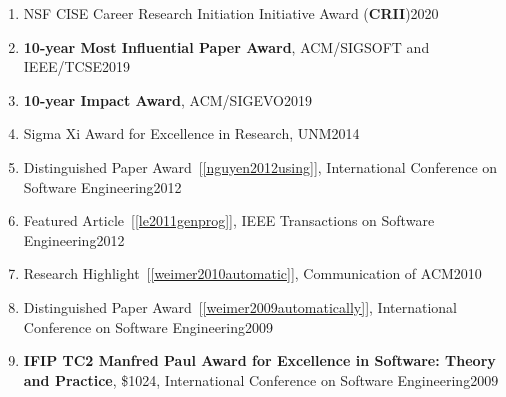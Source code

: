 \documentclass[11pt]{article}
\begin{document}
\begin{enumerate}
\item NSF CISE Career Research Initiation Initiative Award (\textbf{CRII})\hfill 2020
  
\item \textbf{10-year Most Influential Paper Award}, ACM/SIGSOFT and IEEE/TCSE\hfill 2019

  
\item \textbf{10-year Impact Award}, ACM/SIGEVO\hfill 2019

\item  Sigma Xi Award for Excellence in Research, UNM\hfill 2014

\item Distinguished Paper Award~[\ref{nguyen2012using}], International Conference on Software Engineering\hfill 2012

\item Featured Article~[\ref{le2011genprog}], IEEE Transactions on Software Engineering\hfill 2012

\item Research Highlight~[\ref{weimer2010automatic}], Communication of ACM\hfill 2010

\item Distinguished Paper Award~[\ref{weimer2009automatically}], International Conference on Software Engineering\hfill 2009 

\item \textbf{IFIP TC2 Manfred Paul Award for Excellence in Software: Theory and Practice}, \$1024, International Conference on Software Engineering\hfill 2009


\end{enumerate}
\end{document}
